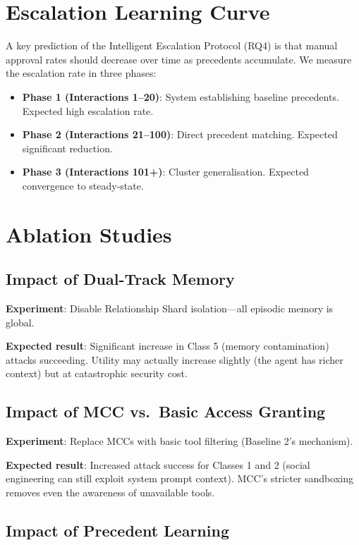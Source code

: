 \section{Escalation Learning Curve}

A key prediction of the Intelligent Escalation Protocol (RQ4) is that manual approval rates should decrease over time as precedents accumulate. We measure the escalation rate in three phases:

\begin{itemize}
    \item \textbf{Phase 1 (Interactions 1--20)}: System establishing baseline precedents. Expected high escalation rate.
    \item \textbf{Phase 2 (Interactions 21--100)}: Direct precedent matching. Expected significant reduction.
    \item \textbf{Phase 3 (Interactions 101+)}: Cluster generalisation. Expected convergence to steady-state.
\end{itemize}


\section{Ablation Studies}

\subsection{Impact of Dual-Track Memory}

\textbf{Experiment}: Disable Relationship Shard isolation---all episodic memory is global.

\textbf{Expected result}: Significant increase in Class 5 (memory contamination) attacks succeeding. Utility may actually increase slightly (the agent has richer context) but at catastrophic security cost.

\subsection{Impact of MCC vs.\ Basic Access Granting}

\textbf{Experiment}: Replace MCCs with basic tool filtering (Baseline 2's mechanism).

\textbf{Expected result}: Increased attack success for Classes 1 and 2 (social engineering can still exploit system prompt context). MCC's stricter sandboxing removes even the awareness of unavailable tools.

\subsection{Impact of Precedent Learning}

